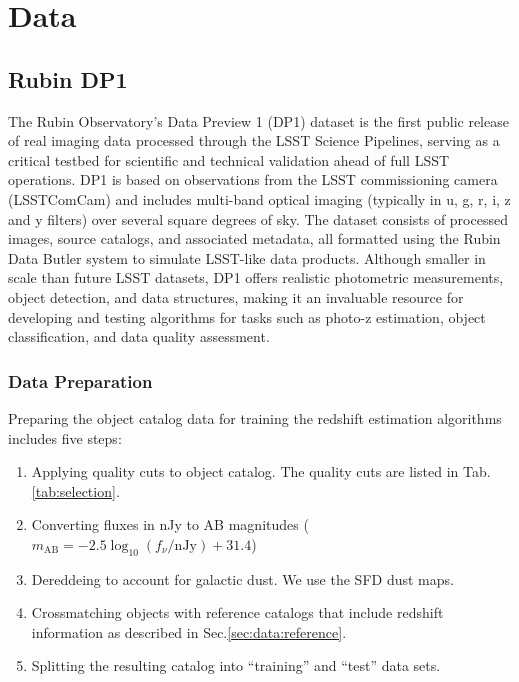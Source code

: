 \section{Data}
\label{sec:data:0}

\subsection{Rubin DP1}
\label{sec:data:dp1}

The Rubin Observatory’s Data Preview 1 (DP1) dataset is the first public release of real imaging data processed through the LSST Science Pipelines, serving as a critical testbed for scientific and technical validation ahead of full LSST operations.  DP1 is based on observations from the LSST commissioning camera (LSSTComCam) and includes multi-band optical imaging (typically in u, g, r, i, z and y filters) over several square degrees of sky. The dataset consists of processed images, source catalogs, and associated metadata, all formatted using the Rubin Data Butler system to simulate LSST-like data products. Although smaller in scale than future LSST datasets, DP1 offers realistic photometric measurements, object detection, and data structures, making it an invaluable resource for developing and testing algorithms for tasks such as photo-z estimation, object classification, and data quality assessment.

\subsubsection{Data Preparation}
\label{sec:data:dp1:preparation}

Preparing the object catalog data for training the redshift estimation algorithms includes five steps:

\begin{enumerate}
\item{Applying quality cuts to object catalog.  The quality cuts are listed in Tab.\ref{tab:selection}.}
\item{Converting fluxes in nJy to AB magnitudes ($m_\text{AB} = -2.5 \log_{10}(f_\nu / \text{nJy}) + 31.4$)}
\item{Dereddeing to account for galactic dust.   We use the SFD dust maps\cite{SFD}.}
\item{Crossmatching objects with reference catalogs that include redshift information as described in Sec.\ref{sec:data:reference}.}
\item{Splitting the resulting catalog into ``training'' and ``test'' data sets.}
\end{enumerate}


